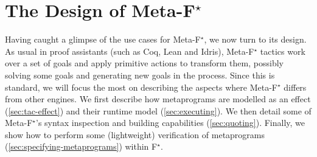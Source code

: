 \documentclass[runningheads]{llncs}
\newcommand\fstar{F$^\star$\xspace}
\newcommand\metafstar{Meta-F$^\star$\xspace}
\begin{document}




\section{The Design of \metafstar}
\label{sec:design}

Having caught a glimpse of the use cases for \metafstar, we now turn to its
design.
%
As usual in proof assistants (such as Coq, Lean and Idris), \metafstar
tactics work over a set of goals and apply primitive actions to
transform them, possibly solving some goals and generating new goals in
the process.
%
Since this is standard, we will focus the most on describing the aspects
where \metafstar differs from other engines.
%
We first describe how metaprograms are modelled as an effect
(\autoref{sec:tac-effect})
and their runtime model (\autoref{sec:executing}).
%
We then detail some of \metafstar's syntax inspection and building
capabilities (\autoref{sec:quoting}).
%
Finally, we show how to perform some (lightweight) verification of
metaprograms (\autoref{sec:specifying-metaprograms}) within \fstar.
\end{document}
